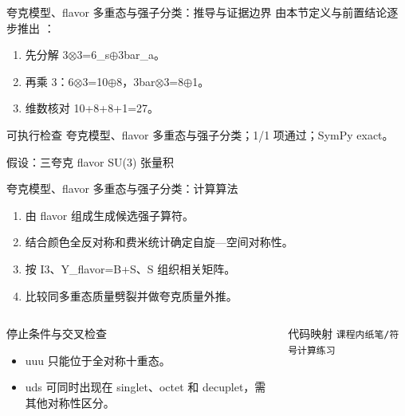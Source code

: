 \begin{frame}[t]{夸克模型、flavor 多重态与强子分类：推导与证据边界}
\footnotesize
{}\quad 由本节定义与前置结论逐步推出 ：
\begin{enumerate}
\item 先分解 3\ensuremath{\otimes}3=6\_s\ensuremath{\oplus}3bar\_a。
\item 再乘 3：6\ensuremath{\otimes}3=10\ensuremath{\oplus}8，3bar\ensuremath{\otimes}3=8\ensuremath{\oplus}1。
\item 维数核对 10+8+8+1=27。
\end{enumerate}\begin{block}{可执行检查}
\quad 夸克模型、flavor 多重态与强子分类；1/1 项通过；SymPy exact。
\par\scriptsize 假设：三夸克 flavor SU(3) 张量积
\end{block}
\end{frame}

\begin{frame}[t]{夸克模型、flavor 多重态与强子分类：计算算法}
\footnotesize
{}\begin{enumerate}
\item 由 flavor 组成生成候选强子算符。
\item 结合颜色全反对称和费米统计确定自旋—空间对称性。
\item 按 I3、Y\_flavor=B+S、S 组织相关矩阵。
\item 比较同多重态质量劈裂并做夸克质量外推。
\end{enumerate}\begin{columns}[T,onlytextwidth]
\begin{block}{停止条件与交叉检查}\scriptsize\begin{itemize}
\item[\CheckMark] uuu 只能位于全对称十重态。
\item[\CheckMark] uds 可同时出现在 singlet、octet 和 decuplet，需其他对称性区分。
\end{itemize}\end{block}
\begin{block}{代码映射}
\scriptsize \texttt{课程内纸笔/\allowbreak{}符号计算练习}
\end{block}\end{columns}\end{frame}

